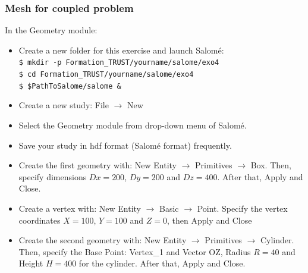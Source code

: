 \documentclass[10pt, hyperref={unicode=true,pdfusetitle, bookmarks=true,bookmarksnumbered=false,bookmarksopen=false, breaklinks=false,pdfborder={0 0l 1},backref=true,colorlinks=true,linkcolor=darkblue,pageanchor}]{beamer}
\begin{document}
\begin{frame}
\frametitle{Mesh for coupled problem}

\begin{block}{In the Geometry module:}
\begin{itemize}

\item Create a new folder for this exercise and launch Salom\'e:\\
\texttt{\$ mkdir -p Formation\_TRUST/yourname/salome/exo4} \\
\texttt{\$ cd Formation\_TRUST/yourname/salome/exo4} \\
\texttt{\$ \$PathToSalome/salome \&} 

\item Create a new study: File $\rightarrow$ New

\item Select the Geometry module from drop-down menu of Salom\'e.

\item Save your study in hdf format (Salom\'e format) frequently.

\item Create the first geometry with: New Entity $\rightarrow$ Primitives $\rightarrow$ Box. Then, specify dimensions $Dx=200$,  $Dy=200$ and $Dz=400$. After that, Apply and Close.

\item Create a vertex with: New Entity $\rightarrow$ Basic $\rightarrow$ Point. Specify the vertex coordinates $X=100$, $Y=100$ and $Z=0$, then Apply and Close

\item Create the second geometry with: New Entity $\rightarrow$ Primitives $\rightarrow$ Cylinder. Then, specify the Base Point: Vertex\_1 and Vector OZ, Radius $R=40$ and Height $H=400$ for the cylinder. After that, Apply and Close.

\end{itemize}
\end{block}

\end{frame}
\end{document}
